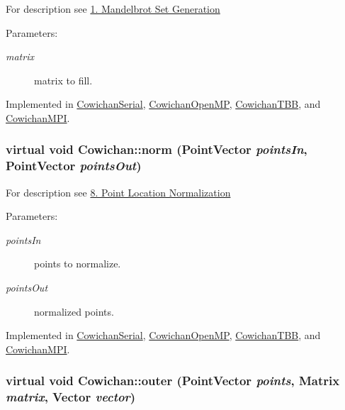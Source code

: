 For description see \hyperlink{index_mandel_sec}{1. Mandelbrot Set Generation} \begin{Desc}
\item[Parameters:]
\begin{description}
\item[{\em matrix}]matrix to fill. \end{description}
\end{Desc}


Implemented in \hyperlink{class_cowichan_serial_97a58b7901d8a7680cc28d42cb94d532}{CowichanSerial}, \hyperlink{class_cowichan_open_m_p_6809c2738792de047ee59259636c1afd}{CowichanOpenMP}, \hyperlink{class_cowichan_t_b_b_1e58b60ff22a58aba69567ecc6740878}{CowichanTBB}, and \hyperlink{class_cowichan_m_p_i_58274fc55ed8a352a8924b130f3b5d2e}{CowichanMPI}.\hypertarget{class_cowichan_3df21e3c627958114e045c3559a29f30}{
\subsubsection[{norm}]{\setlength{\rightskip}{0pt plus 5cm}virtual void Cowichan::norm ({\bf PointVector} {\em pointsIn}, \/  {\bf PointVector} {\em pointsOut})}}
\label{class_cowichan_3df21e3c627958114e045c3559a29f30}


For description see \hyperlink{index_norm_sec}{8. Point Location Normalization} \begin{Desc}
\item[Parameters:]
\begin{description}
\item[{\em pointsIn}]points to normalize. \item[{\em pointsOut}]normalized points. \end{description}
\end{Desc}


Implemented in \hyperlink{class_cowichan_serial_0eeb47447c6a6b94ff7c6999c96fda0e}{CowichanSerial}, \hyperlink{class_cowichan_open_m_p_4ffbe36816235bc6abec30eae2be2d78}{CowichanOpenMP}, \hyperlink{class_cowichan_t_b_b_ca08645b51a242317a115cd7ce7d81fe}{CowichanTBB}, and \hyperlink{class_cowichan_m_p_i_11df49e804427d4a0d085f4cff9302d0}{CowichanMPI}.\hypertarget{class_cowichan_52f17221019290b88334b0ca7f3bcdb9}{
\subsubsection[{outer}]{\setlength{\rightskip}{0pt plus 5cm}virtual void Cowichan::outer ({\bf PointVector} {\em points}, \/  {\bf Matrix} {\em matrix}, \/  {\bf Vector} {\em vector})}}
\label{class_cowichan_52f17221019290b88334b0ca7f3bcdb9}



